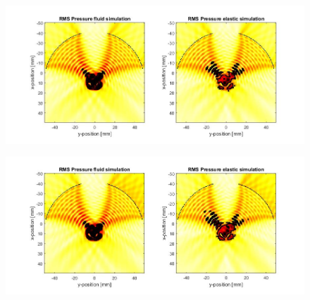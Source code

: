 \documentclass[10pt,a4paper]{article}
\begin{document}
\begin{figure}[H]\label{comp_290kHz}
\hspace*{-4cm}                                                    
\includegraphics[scale=0.6]{comp_290kHz}
\end{figure}
\begin{figure}[H]\label{comp_300kHz}
\hspace*{-4cm}                                                    
\includegraphics[scale=0.6]{comp_300kHz}
\end{figure}




\newpage
{}

\end{document}
